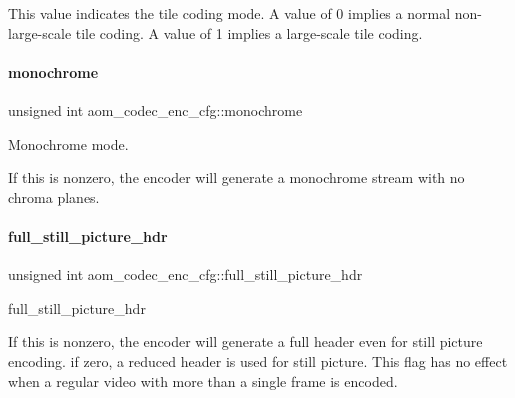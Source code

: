 This value indicates the tile coding mode. A value of 0 implies a normal non-\/large-\/scale tile coding. A value of 1 implies a large-\/scale tile coding. \mbox{\label{structaom__codec__enc__cfg_a71d97f2a1ff3850955c50705104ac54a}} 
\paragraph{\texorpdfstring{monochrome}{monochrome}}
{\footnotesize\ttfamily unsigned int aom\+\_\+codec\+\_\+enc\+\_\+cfg\+::monochrome}



Monochrome mode. 

If this is nonzero, the encoder will generate a monochrome stream with no chroma planes. \mbox{\label{structaom__codec__enc__cfg_a35b8433fa60af32d0aecc2b56e736a98}} 
\paragraph{\texorpdfstring{full\+\_\+still\+\_\+picture\+\_\+hdr}{full\_still\_picture\_hdr}}
{\footnotesize\ttfamily unsigned int aom\+\_\+codec\+\_\+enc\+\_\+cfg\+::full\+\_\+still\+\_\+picture\+\_\+hdr}



full\+\_\+still\+\_\+picture\+\_\+hdr 

If this is nonzero, the encoder will generate a full header even for still picture encoding. if zero, a reduced header is used for still picture. This flag has no effect when a regular video with more than a single frame is encoded. \mbox{\label{structaom__codec__enc__cfg_adb3fe41c1ce39579a49b97bc2ca7b2f2}} 

